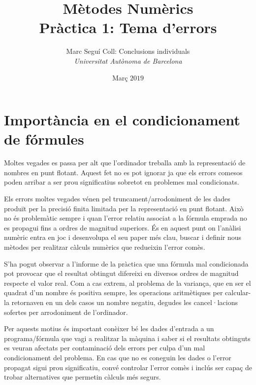 \documentclass[a4paper,10.4pt]{article}
\begin{document}
 
\title{\Large\bfseries\sffamily Mètodes Numèrics\\Pràctica 1: \Large\sffamily Tema d'errors}
\author{\sffamily Marc Seguí Coll: Conclusions individuals\\\normalsize\emph{Universitat Autònoma de Barcelona}}
\date{\normalsize Març \emph{$2019$}}


\maketitle
 
\section{Importància en el condicionament de fórmules}

Moltes vegades es passa per alt que l'ordinador treballa amb la representació de nombres en punt flotant. Aquest fet no es pot ignorar ja que els errors comesos poden arribar a ser prou significatius sobretot en problemes mal condicionats.

Els errors moltes vegades vénen pel truncament/arrodoniment de les dades produït per la precisió finita limitada per la representació en punt flotant. Això no és problemàtic sempre i quan l'error relatiu associat a la fórmula emprada no es propagui fins a ordres de magnitud superiors. És en aquest punt on l'anàlisi numèric entra en joc i desenvolupa el seu paper més clau, buscar i definir nous mètodes per realitzar càlculs numèrics que redueixin l'error comès.

S'ha pogut observar a l'informe de la pràctica que una fórmula mal condicionada pot provocar que el resultat obtingut difereixi en diversos ordres de magnitud respecte el valor real. Com a cas extrem, al problema de la variança, que en ser el quadrat d'un nombre és positiva sempre, les operacions aritmètiques per calcular-la retornaven en un dels casos un nombre negatiu, degudes les cancel·lacions sofertes per arrodoniment de l'ordinador.

Per aquests motius és important conèixer bé les dades d'entrada a un programa/fórmula que vagi a realitzar la màquina i saber si el resultats obtinguts es veuran afectats per contaminació dels errors per culpa d'un mal condicionament del problema. En cas que no es coneguin les dades o l'error propagat sigui prou significatiu, convé controlar l'error comès i inclús ser capaç de trobar alternatives que permetin càlculs més segurs.
\end{document}
